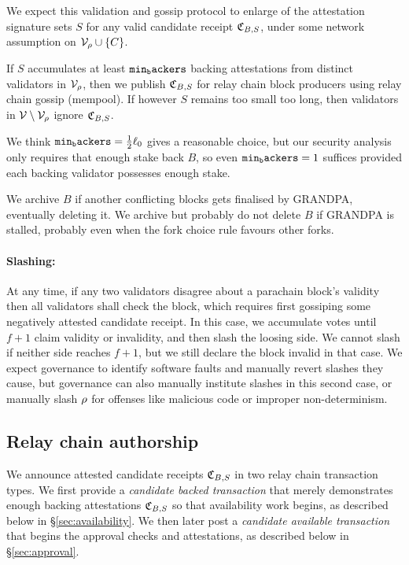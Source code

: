 We expect this validation and gossip protocol to enlarge of the attestation signature sets $S$ for any valid candidate receipt $\mathfrak{C}_{B,S}$, under some network assumption on $\mathcal{V}_{\rho} \cup \{C\}$.

If $S$ accumulates at least $\mathtt{min_backers}$ backing attestations from distinct validators in $\mathcal{V}_{\rho}$, then we publish $\mathfrak{C}_{B,S}$ for relay chain block producers using relay chain gossip (mempool).
If however $S$ remains too small too long, then validators in $\mathcal{V} \setminus \mathcal{V}_{\rho}$ ignore $\mathfrak{C}_{B,S}$.

We think $\mathtt{min_backers} = {1\over2} \ell_0$ gives a reasonable choice, but our security analysis only requires that enough stake back $B$, so even $\mathtt{min_backers} = 1$ suffices provided each backing validator possesses enough stake.

We archive $B$ if another conflicting blocks gets finalised by GRANDPA, eventually deleting it.  We archive but probably do not delete $B$ if GRANDPA is stalled, probably even when the fork choice rule favours other forks. 

\smallskip\paragraph{Slashing:}

At any time, if any two validators disagree about a parachain block's validity then all validators shall check the block, which requires first gossiping some negatively attested candidate receipt.  In this case, we accumulate votes until $f+1$ claim validity or invalidity, and then slash the loosing side.  We cannot slash if neither side reaches $f+1$, but we still declare the block invalid in that case.  We expect governance to identify software faults and manually revert slashes they cause, but governance can also manually institute slashes in this second case, or manually slash $\rho$ for offenses like malicious code or improper non-determinism. 


\subsection{Relay chain authorship} %
\label{sec:authorship}

We announce attested candidate receipts $\mathfrak{C}_{B,S}$ in two relay chain transaction types.  We first provide a {\em candidate backed transaction} that merely demonstrates enough backing attestations $\mathfrak{C}_{B,S}$ so that availability work begins, as described below in \S\ref{sec:availability}.  We then later post a {\em candidate available transaction} that begins the approval checks and attestations, as described below in \S\ref{sec:approval}.

